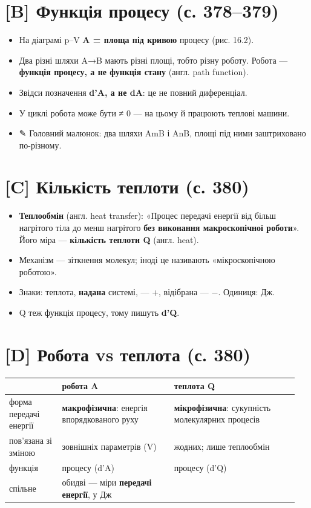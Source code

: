 \documentclass[11pt,a4paper,oneside]{book}
\newcommand{\pen}{{\sffamily\color{accent}✎}}
\begin{document}
\section*{[B] Функція процесу (с. 378–379)}
\begin{itemize}
\item На діаграмі p–V \textbf{A = площа під кривою} процесу (рис. 16.2).
\item Два різні шляхи A→B мають різні площі, тобто різну роботу. Робота — \textbf{функція процесу, а не функція стану} (англ. path function).
\item Звідси позначення \textbf{d'A, а не dA}: це не повний диференціал.
\item У циклі робота може бути ≠ 0 — на цьому й працюють теплові машини.
\item \pen{} Головний малюнок: два шляхи AmB і AnB, площі під ними заштриховано по-різному.
\end{itemize}

\section*{[C] Кількість теплоти (с. 380)}
\begin{itemize}
\item \textbf{Теплообмін} (англ. heat transfer): «Процес передачі енергії від більш нагрітого тіла до менш нагрітого \textbf{без виконання макроскопічної роботи}». Його міра — \textbf{кількість теплоти Q} (англ. heat).
\item Механізм — зіткнення молекул; іноді це називають «мікроскопічною роботою».
\item Знаки: теплота, \textbf{надана} системі, — +, відібрана — −. Одиниця: Дж.
\item Q теж функція процесу, тому пишуть \textbf{d'Q}.
\end{itemize}

\section*{[D] Робота vs теплота (с. 380)}
{\small
\begin{longtable}{>{\raggedright\arraybackslash}p{0.179\linewidth}>{\raggedright\arraybackslash}p{0.366\linewidth}>{\raggedright\arraybackslash}p{0.407\linewidth}}
\toprule
\textbf{} & \textbf{робота A} & \textbf{теплота Q} \\
\midrule
\endhead
форма передачі енергії & \textbf{макрофізична}: енергія впорядкованого руху & \textbf{мікрофізична}: сукупність молекулярних процесів \\
пов'язана зі зміною & зовнішніх параметрів (V) & жодних; лише теплообмін \\
функція & процесу (d'A) & процесу (d'Q) \\
спільне & обидві — міри \textbf{передачі енергії}, у Дж &  \\
\bottomrule
\end{longtable}
}
\end{document}
